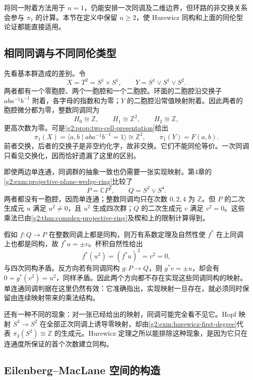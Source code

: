 将同一附着方法用于 \(n=1\)，仍能安排一次同调及二维边界，但环路的非交换关系会参与 \(\pi_1\) 的计算。本节在定义中保留 \(n\ge2\)，使 Hurewicz 同构和上面的同伦型论证都能直接适用。

\subsection{相同同调与不同同伦类型}
\label{g2:subsec:0904:03}

先看基本群造成的差别。令
\[
	X=T^2=S^1\times S^1,\qquad Y=S^1\vee S^1\vee S^2.
\]
两者都有一个零胞腔、两个一胞腔和一个二胞腔。环面的二胞腔沿交换子 \(aba^{-1}b^{-1}\) 附着，各字母的指数和为零；\(Y\) 的二胞腔沿常值映射附着。因此两者的胞腔微分都为零，整数同调同为
\[
	H_0\cong\mathbb Z,\qquad H_1\cong\mathbb Z^2,\qquad H_2\cong\mathbb Z,
\]
更高次数为零。可是\cref{g2:prop:two-cell-presentation}给出
\[
	\pi_1(X)=\langle a,b\mid aba^{-1}b^{-1}=1\rangle\cong\mathbb Z^2,
	\qquad \pi_1(Y)=F(a,b).
\]
前者交换，后者的交换子是非空约化字，故非交换。它们不能同伦等价。一次同调只看见交换化，因而恰好遗漏了这里的区别。

\ProseParagraphBreak

即使两边单连通，同调群的抽象一致也仍需要一张实现映射。第4章的\cref{g2:exm:projective-plane-wedge-ring}比较了
\[
	P=\mathbb CP^2,\qquad Q=S^2\vee S^4.
\]
两者都没有一胞腔，因而单连通；整数同调均只在次数 \(0,2,4\) 为 \(\mathbb Z\)。但 \(P\) 的二次生成元 \(u\) 满足 \(u^2\ne0\)，且 \(u^2\) 生成四次群；\(Q\) 的二次生成元 \(v\) 满足 \(v^2=0\)。这些乘法已由\cref{g2:thm:complex-projective-ring}及楔和上的限制计算得到。

假如 \(f:Q\to P\) 在整数同调上都是同构，则万有系数定理及自然性使 \(f^*\) 在上同调上也都是同构，故 \(f^*u=\pm v\)。杯积自然性给出
\[
	f^*(u^2)=(f^*u)^2=v^2=0,
\]
与四次同构矛盾。反方向若有同调同构 \(g:P\to Q\)，则 \(g^*v=\pm u\)，却会有 \(0=g^*(v^2)=u^2\)，同样矛盾。因此两个方向都不存在实现这些同调同构的映射。单连通同调判据在这里仍然有效：它准确指出，实现映射一旦存在，就必须同时保留由连续映射带来的乘法结构。

\ProseParagraphBreak

还有一种不同的现象：对一张已经给出的映射，同调可能完全看不见它。Hopf 映射 \(S^3\to S^2\) 在全部正次同调上诱导零映射，却由\cref{g2:exm:hurewicz-first-degree}代表 \(\pi_3(S^2)\cong\mathbb Z\) 的生成元。Hurewicz 定理之所以能排除这种现象，是因为它只在连通度所保证的首个次数建立同构。

\subsection{Eilenberg–MacLane 空间的构造}
\label{g2:subsec:0904:04}


